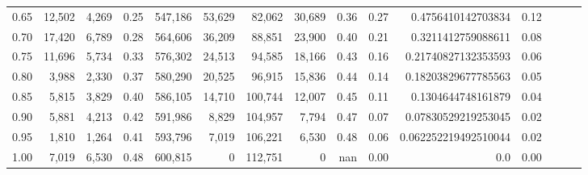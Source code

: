 \begin{tabular}{rrrrrrrrrrrrrrr}
0.65 &  12,502 &   4,269 &  0.25 &  547,186 &   53,629 &   82,062 &   30,689 &  0.36 &  0.27 &    0.4756410142703834 &      0.12 \\
0.70 &  17,420 &   6,789 &  0.28 &  564,606 &   36,209 &   88,851 &   23,900 &  0.40 &  0.21 &    0.3211412759088611 &      0.08 \\
0.75 &  11,696 &   5,734 &  0.33 &  576,302 &   24,513 &   94,585 &   18,166 &  0.43 &  0.16 &   0.21740827132353593 &      0.06 \\
0.80 &   3,988 &   2,330 &  0.37 &  580,290 &   20,525 &   96,915 &   15,836 &  0.44 &  0.14 &   0.18203829677785563 &      0.05 \\
0.85 &   5,815 &   3,829 &  0.40 &  586,105 &   14,710 &  100,744 &   12,007 &  0.45 &  0.11 &    0.1304644748161879 &      0.04 \\
0.90 &   5,881 &   4,213 &  0.42 &  591,986 &    8,829 &  104,957 &    7,794 &  0.47 &  0.07 &   0.07830529219253045 &      0.02 \\
0.95 &   1,810 &   1,264 &  0.41 &  593,796 &    7,019 &  106,221 &    6,530 &  0.48 &  0.06 &  0.062252219492510044 &      0.02 \\
1.00 &   7,019 &   6,530 &  0.48 &  600,815 &        0 &  112,751 &        0 &   nan &  0.00 &                   0.0 &      0.00 \\
\bottomrule
\end{tabular}
